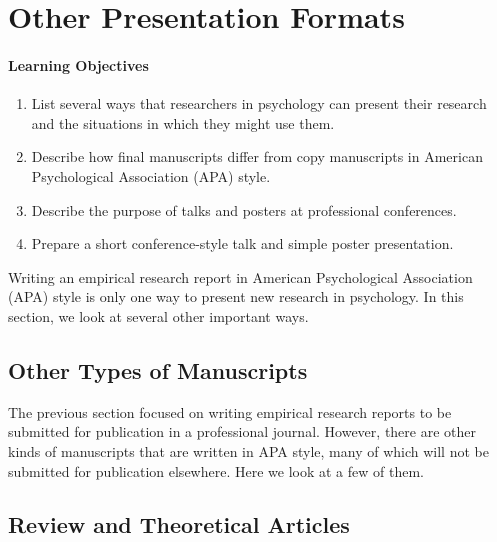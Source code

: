 \section{Other Presentation Formats}

\paragraph{Learning Objectives}
    \begin{enumerate}
    \item   List several ways that researchers in psychology can present their research and the situations in which they might use them.

    \item Describe how final manuscripts differ from copy manuscripts in American Psychological Association (APA) style.

    \item Describe the purpose of talks and posters at professional conferences.
    \item Prepare a short conference-style talk and simple poster presentation.

      \end{enumerate}
  

Writing an empirical research report in American Psychological Association (APA) style is only one way to present new research in psychology. In this section, we look at several other important ways.


\subsection{Other Types of Manuscripts}

The previous section focused on writing empirical research reports to be submitted for publication in a professional journal. However, there are other kinds of manuscripts that are written in APA style, many of which will not be submitted for publication elsewhere. Here we look at a few of them.

\subsection{Review and Theoretical Articles}

